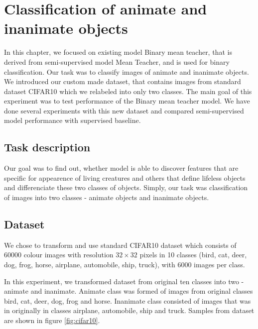 \chapter{Classification of animate and inanimate objects}
\label{chap:bmt-exp} %

In this chapter, we focused on existing model Binary mean teacher, that is derived from semi-supervised model Mean Teacher, and is used for binary classification. Our task was to classify images of animate and inanimate objects. We introduced our custom made dataset, that contains images from standard dataset CIFAR10 which we relabeled into only two classes. The main goal of this experiment was to test performance of the Binary mean teacher model. We have done several experiments with this new dataset and compared semi-supervised model performance with supervised baseline.


\section{Task description}

Our goal was to find out, whether model is able to discover features that are specific for appearence of living creatures and others that define lifeless objects and differenciate these two classes of objects.
Simply, our task was classification of images into two classes - animate objects and inanimate objects. 

\section{Dataset}
\label{dataset-cifar10}

We chose to transform and use standard CIFAR10 dataset \cite{krizhevsky2009} which consists of $60000$ colour images with resolution $32 \times 32$ pixels in 10 classes (bird, cat, deer, dog, frog, horse, airplane, automobile, ship, truck), with $6000$ images per class. 

In this experiment, we transformed dataset from original ten classes into two - animate and inanimate. Animate class
was formed of images from original classes bird, cat, deer, dog, frog and horse. Inanimate class consisted of images that was in originally in classes airplane, automobile, ship and truck. Samples from dataset are shown in figure \ref{fig:cifar10}.

